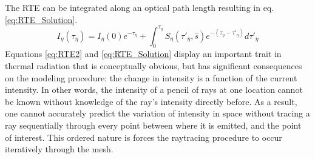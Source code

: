 The RTE can be integrated along an optical path length resulting in eq. \ref{eq:RTE_Solution}.
\begin{equation}
    I_\eta{}(\tau{}_\eta{}) = I_\eta{}(0)e^{-\tau{}_\eta{}}+\int_{0}^{\tau{}_\eta{}}{S_\eta{}(\tau{}'_\eta{},\hat{s})e^{-(\tau{}_\eta{}-\tau{}'_\eta{})}}d\tau{}'_\eta{}
    \label{eq:RTE_Solution}
\end{equation}
Equations \ref{eq:RTE2} and \ref{eq:RTE_Solution} display an important trait in thermal radiation that is conceptually obvious, but has significant consequences on the modeling procedure:
the change in intensity is a function of the current intensity. In other words, the intensity of a pencil of rays at one location cannot be known without knowledge of the ray's intensity directly before.
As a result, one cannot accurately predict the variation of intensity in space without tracing a ray sequentially through every point between where it is emitted, and the point of interest.
This ordered nature is forces the raytracing procedure to occur iteratively through the mesh.

